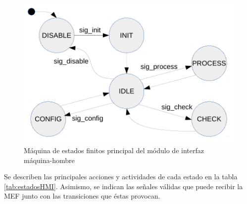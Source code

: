 \begin{figure}[htpb]
	\centering
	\includegraphics[width=\textwidth]{./Figures/MEF_HMI.pdf}
	\caption[MEF principal del módulo de HMI]{Máquina de estados finitos principal del módulo de interfaz máquina-hombre}
	\label{fig:mef_HMI}
\end{figure}

Se describen las principales acciones y actividades de cada estado en la tabla \ref{tab:estadosHMI}.  Asimismo, se indican las señales válidas que puede recibir la MEF junto con las transiciones que éstas provocan.


